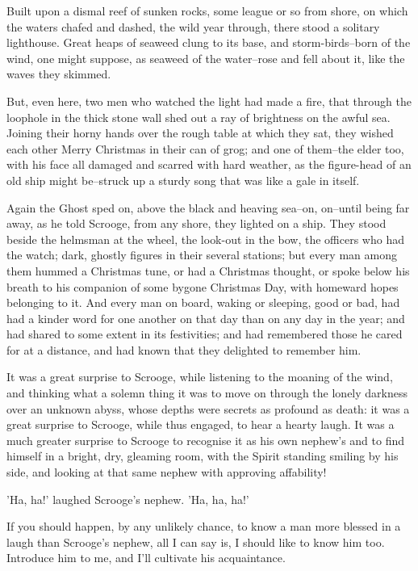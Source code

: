 Built upon a dismal reef of sunken rocks, some league or so from shore,
on which the waters chafed and dashed, the wild year through, there
stood a solitary lighthouse. Great heaps of seaweed clung to its base,
and storm-birds--born of the wind, one might suppose, as seaweed of the
water--rose and fell about it, like the waves they skimmed.

But, even here, two men who watched the light had made a fire, that
through the loophole in the thick stone wall shed out a ray of
brightness on the awful sea. Joining their horny hands over the rough
table at which they sat, they wished each other Merry Christmas in their
can of grog; and one of them--the elder too, with his face all damaged
and scarred with hard weather, as the figure-head of an old ship might
be--struck up a sturdy song that was like a gale in itself.

Again the Ghost sped on, above the black and heaving sea--on, on--until
being far away, as he told Scrooge, from any shore, they lighted on a
ship. They stood beside the helmsman at the wheel, the look-out in the
bow, the officers who had the watch; dark, ghostly figures in their
several stations; but every man among them hummed a Christmas tune, or
had a Christmas thought, or spoke below his breath to his companion of
some bygone Christmas Day, with homeward hopes belonging to it. And
every man on board, waking or sleeping, good or bad, had had a kinder
word for one another on that day than on any day in the year; and had
shared to some extent in its festivities; and had remembered those he
cared for at a distance, and had known that they delighted to remember
him.

It was a great surprise to Scrooge, while listening to the moaning of
the wind, and thinking what a solemn thing it was to move on through the
lonely darkness over an unknown abyss, whose depths were secrets as
profound as death: it was a great surprise to Scrooge, while thus
engaged, to hear a hearty laugh. It was a much greater surprise to
Scrooge to recognise it as his own nephew's and to find himself in a
bright, dry, gleaming room, with the Spirit standing smiling by his
side, and looking at that same nephew with approving affability!

'Ha, ha!' laughed Scrooge's nephew. 'Ha, ha, ha!'

If you should happen, by any unlikely chance, to know a man more blessed
in a laugh than Scrooge's nephew, all I can say is, I should like to
know him too. Introduce him to me, and I'll cultivate his acquaintance.


